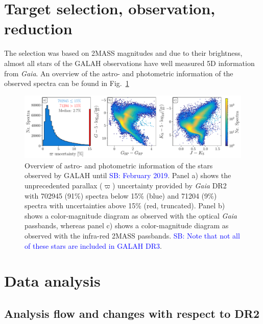 \documentclass[fleqn,usenatbib,useAMS]{mnras}
\newcommand{\Gaia}{\textit{Gaia}\xspace}
\newcommand\SB[1]{\textcolor{blue}{SB: #1}}
\begin{document}
\section{Target selection, observation, reduction} \label{sec:selection_observation_reduction}

The selection was based on 2MASS \citep{Skrutskie2006} magnitudes and due to their brightness, almost all stars of the GALAH observations have well measured 5D information from \Gaia \citep{Brown2018, Lindegren2018}. An overview of the astro- and photometric information of the observed spectra can be found in Fig.~\ref{fig:plot_parallax_quality_and_cmds}

\begin{figure}
\centering
\includegraphics[width=\textwidth]{figures/plot_parallax_quality_and_cmds.pdf}
\caption{Overview of astro- and photometric information of the stars observed by GALAH until \SB{February 2019}. Panel a) shows the unprecedented parallax ($\varpi$) uncertainty provided by \Gaia DR2 with 702945 (91\%) spectra below 15\% (blue) and 71204 (9\%) spectra with uncertainties above 15\% (red, truncated). Panel b) shows a color-magnitude diagram as observed with the optical \Gaia passbands, whereas panel c) shows a color-magnitude diagram as observed with the infra-red 2MASS passbands. \SB{Note that not all of these stars are included in GALAH DR3}.}
\label{fig:plot_parallax_quality_and_cmds}
\end{figure}

\section{Data analysis} \label{sec:analysis}

\subsection{Analysis flow and changes with respect to DR2} \label{sec:analysis_flow}
\end{document}
